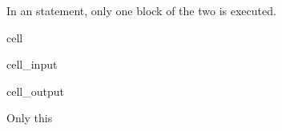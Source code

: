 \documentclass[letterpaper,10pt,english]{jupyterBook}
\begin{document}
\sphinxAtStartPar
In an  statement, only one block of the two is executed.

\begin{sphinxuseclass}{cell}\begin{sphinxVerbatimInput}

\begin{sphinxuseclass}{cell_input}
\begin{sphinxVerbatim}[commandchars=\\\{\}]
 
\end{sphinxVerbatim}

\end{sphinxuseclass}\end{sphinxVerbatimInput}
\begin{sphinxVerbatimOutput}

\begin{sphinxuseclass}{cell_output}
\begin{sphinxVerbatim}[commandchars=\\\{\}]
Only this
\end{sphinxVerbatim}

\end{sphinxuseclass}\end{sphinxVerbatimOutput}

\end{sphinxuseclass}
\end{document}
